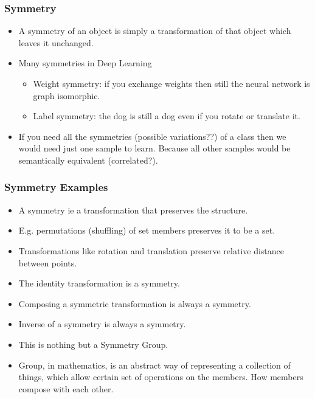 \begin{frame}[fragile]\frametitle{Symmetry}

\begin{itemize}
\item  A symmetry of an object is simply a transformation of that object which leaves it unchanged.
\item Many symmetries in Deep Learning
\begin{itemize}
\item Weight symmetry: if you exchange weights then still the neural network is graph isomorphic.
\item Label symmetry: the dog is still a dog even if you rotate or translate it.
\end{itemize}
\item If you need all the symmetries (possible variations??) of a class then we would need just one sample to learn. Because all other samples would be semantically equivalent (correlated?).
\end{itemize}


\end{frame}

\begin{frame}[fragile]\frametitle{Symmetry Examples}

\begin{itemize}
\item A symmetry ie a transformation that preserves the structure.
\item E.g. permutations (shuffling) of set members preserves it to be a set.
\item Transformations like rotation and translation preserve relative distance between points.
\item The identity transformation is a symmetry.
\item Composing a symmetric transformation is always a symmetry.
\item Inverse of a symmetry is always a symmetry.
\item This is nothing but a Symmetry Group. 
\item Group, in mathematics, is an abstract way of representing a collection of things, which allow certain set of operations on the members. How members compose with each other.
\end{itemize}
	
\end{frame}


